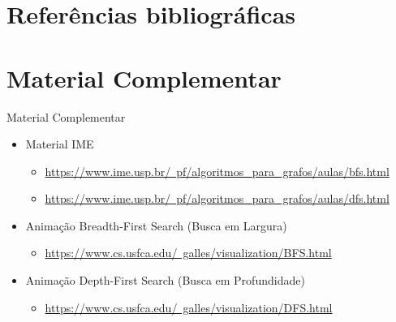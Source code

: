 \documentclass{beamer}
\begin{document}

\section{Referências bibliográficas}

\section{Material Complementar}

\begin{frame}{Material Complementar}
   \begin{itemize}
	\item Material IME
	\begin{itemize}
   \item \href{https://www.ime.usp.br/~pf/algoritmos_para_grafos/aulas/bfs.html}{https://www.ime.usp.br/~pf/algoritmos\_para\_grafos/aulas/bfs.html}      
   \item \href{https://www.ime.usp.br/~pf/algoritmos_para_grafos/aulas/dfs.html}{https://www.ime.usp.br/~pf/algoritmos\_para\_grafos/aulas/dfs.html}   	
	\end{itemize}		
   \item Animação Breadth-First Search (Busca em Largura)
   \begin{itemize}
   \item \href{https://www.cs.usfca.edu/~galles/visualization/BFS.html}{https://www.cs.usfca.edu/~galles/visualization/BFS.html}   
   \end{itemize}
   \item Animação Depth-First Search (Busca em Profundidade)
   \begin{itemize}
   \item \href{https://www.cs.usfca.edu/~galles/visualization/DFS.html}{https://www.cs.usfca.edu/~galles/visualization/DFS.html}   
   \end{itemize}
   \end{itemize}
\end{frame}    
\end{document}
